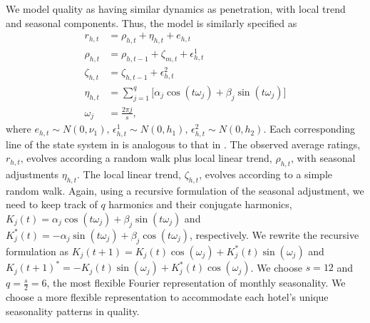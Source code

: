 \documentclass{informs_mod} %
\begin{document}
We model quality as having similar dynamics as penetration, with local trend and seasonal components. Thus, the model is similarly specified as 
\begin{equation}\label{eq:ratings_dlm}
\begin{split}
r_{h,t}&=\rho_{h,t}+\eta_{h,t}+e_{h,t}\\
\rho_{h,t}&=\rho_{h,t-1}+\zeta_{m,t}+\epsilon_{h,t}^{1} \\
\zeta_{h,t} &= \zeta_{h,t-1} +\epsilon_{h,t}^{2} \\
\eta_{h,t} &=\sum_{j=1}^{q}\big[\alpha_j\cos(t\omega_j)+\beta_j\sin(t\omega_j)\big] \\
\omega_j &= \frac{2\pi j}{s},
\end{split}
\end{equation}
where $e_{h,t}\sim N(0,\nu_1)\text{, }\epsilon_{h,t}^{1}\sim N(0,h_1)\text{, }\epsilon_{h,t}^{2}\sim N(0,h_2)$. Each corresponding line of the state system in  is analogous to that in . The observed average ratings, $r_{h,t}$, evolves according a random walk plus local linear trend, $\rho_{h,t}$, with seasonal adjustments $\eta_{h,t}$. The local linear trend, $\zeta_{h,t}$, evolves according to a simple random walk. Again, using a recursive formulation of the seasonal adjustment, we need to keep track of $q$ harmonics and their conjugate harmonics, $K_j(t)=\alpha_j\cos(t\omega_j)+\beta_j\sin(t\omega_j)$ and $K_j^{*}(t)=-\alpha_j\sin(t\omega_j)+\beta_j\cos(t\omega_j)$, respectively. We rewrite the recursive formulation as $K_j(t+1)=K_j(t)\cos(\omega_j)+K_j^{*}(t)\sin(\omega_j)$ and $K_j(t+1)^{*}=-K_j(t)\sin(\omega_j)+K_j^{*}(t)\cos(\omega_j)$. We choose $s=12$ and $q=\frac{s}{2}=6$, the most flexible Fourier representation of monthly seasonality. We choose a more flexible representation to accommodate each hotel's unique seasonality patterns in quality. 
\end{document}
